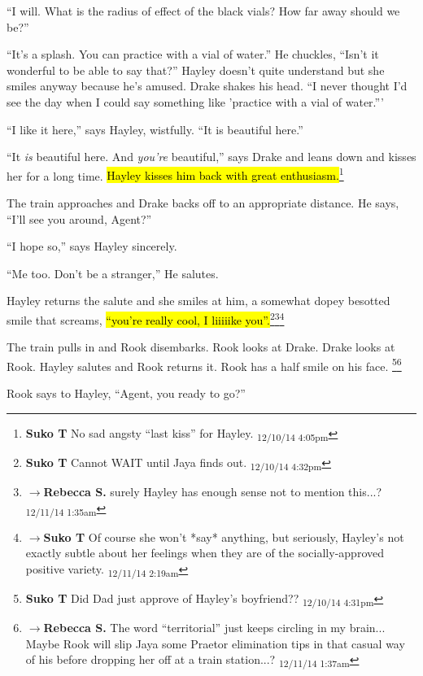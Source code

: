 ``I will.  What is the radius of effect of the black vials?  How far away should we be?''

``It's a splash.  You can practice with a vial of water.''  He chuckles, ``Isn't it wonderful to be able to say that?''  Hayley doesn't quite understand but she smiles anyway because he's amused.  Drake shakes his head.  ``I never thought I'd see the day when I could say something like 'practice with a vial of water.'''

``I like it here,'' says Hayley, wistfully.  ``It is beautiful here.''

``It \textit{is} beautiful here.  And \textit{you're} beautiful,'' says Drake and leans down and kisses her for a long time.  \hl{Hayley kisses him back with great enthusiasm.}\footnote{\textbf{Suko T }No sad angsty ``last kiss'' for Hayley. \textsubscript{12/10/14 4:05pm}}  



The train approaches and Drake backs off to an appropriate distance.  He says, ``I'll see you around, Agent?''

``I hope so,'' says Hayley sincerely.

``Me too.  Don't be a stranger,'' He salutes.

Hayley returns the salute and she smiles at him, a somewhat dopey besotted smile that screams, \hl{``you're really cool, I liiiiike you''.}\footnote{\textbf{Suko T }Cannot WAIT until Jaya finds out. \textsubscript{12/10/14 4:32pm}}\footnote{$\rightarrow$\textbf{Rebecca S. }surely Hayley has enough sense not to mention this...? \textsubscript{12/11/14 1:35am}}\footnote{$\rightarrow$\textbf{Suko T }Of course she won't *say* anything, but seriously, Hayley's not exactly subtle about her feelings when they are of the socially-approved positive variety. \textsubscript{12/11/14 2:19am}}



The train pulls in and Rook disembarks.  Rook looks at Drake. Drake looks at Rook. Hayley salutes and Rook returns it.  Rook has a half smile on his face.  \footnote{\textbf{Suko T }Did Dad just approve of Hayley's boyfriend?? \textsubscript{12/10/14 4:31pm}}\footnote{$\rightarrow$\textbf{Rebecca S. }The word ``territorial'' just keeps circling in my brain...
Maybe Rook will slip Jaya some Praetor elimination tips in that casual way of his before dropping her off at a train station...? \textsubscript{12/11/14 1:37am}}

Rook says to Hayley, ``Agent, you ready to go?''


